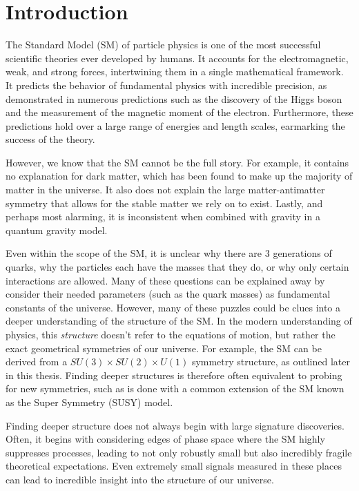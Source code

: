 \chapter{Introduction}

The Standard Model (SM) of particle physics is one of the most successful scientific theories ever developed by humans. It accounts for the electromagnetic, weak, and strong forces, intertwining them in a single mathematical framework. It predicts the behavior of fundamental physics with incredible precision, as demonstrated in numerous predictions such as the discovery of the Higgs boson and the measurement of the magnetic moment of the electron. Furthermore, these predictions hold over a large range of energies and length scales, earmarking the success of the theory.

However, we know that the SM cannot be the full story. For example, it contains no explanation for dark matter, which has been found to make up the majority of matter in the universe. It also does not explain the large matter-antimatter symmetry that allows for the stable matter we rely on to exist. Lastly, and perhaps most alarming, it is inconsistent when combined with gravity in a quantum gravity model. 

Even within the scope of the SM, it is unclear why there are 3 generations of quarks, why the particles each have the masses that they do, or why only certain interactions are allowed. Many of these questions can be explained away by consider their needed parameters (such as the quark masses) as fundamental constants of the universe. However, many of these puzzles could be clues into a deeper understanding of the structure of the SM. In the modern understanding of physics, this \textit{structure} doesn't refer to the equations of motion, but rather the exact geometrical symmetries of our universe. For example, the SM can be derived from a $SU(3) \times SU(2) \times U(1)$ symmetry structure, as outlined later in this thesis. Finding deeper structures is therefore often equivalent to probing for new symmetries, such as is done with a common extension of the SM known as the Super Symmetry (SUSY) model. 

Finding deeper structure does not always begin with large signature discoveries. Often, it begins with considering edges of phase space where the SM highly suppresses processes, leading to not only robustly small but also incredibly fragile theoretical expectations. Even extremely small signals measured in these places can lead to incredible insight into the structure of our universe.


